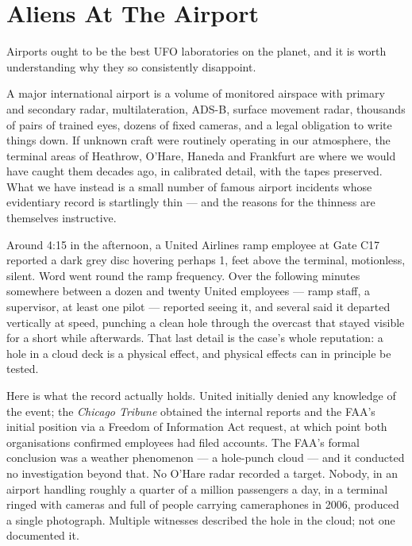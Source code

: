 \section{Aliens At The Airport}\label{sec:airport}

Airports ought to be the best UFO laboratories on the planet, and it is worth understanding why
they so consistently disappoint.

A major international airport is a volume of monitored airspace with primary and secondary radar,
multilateration, ADS-B, surface movement radar, thousands of pairs of trained eyes, dozens of
fixed cameras, and a legal obligation to write things down. If unknown craft were routinely
operating in our atmosphere, the terminal areas of Heathrow, O'Hare, Haneda and Frankfurt are
where we would have caught them decades ago, in calibrated detail, with the tapes preserved. What
we have instead is a small number of famous airport incidents whose evidentiary record is
startlingly thin --- and the reasons for the thinness are themselves instructive.

Around 4:15 in the afternoon, a United Airlines ramp employee at Gate C17 reported a dark grey
disc hovering perhaps 1, feet above the terminal, motionless, silent. Word went round the ramp
frequency. Over the following minutes somewhere between a dozen and twenty United employees ---
ramp staff, a supervisor, at least one pilot --- reported seeing it, and several said it departed
vertically at speed, punching a clean hole through the overcast that stayed visible for a short
while afterwards. That last detail is the case's whole reputation: a hole in a cloud deck is a
physical effect, and physical effects can in principle be tested.

Here is what the record actually holds. United initially denied any knowledge of the event; the
\emph{Chicago Tribune} obtained the internal reports and the FAA's initial position via a Freedom
of Information Act request, at which point both organisations confirmed employees had filed
accounts. The FAA's formal conclusion was a weather phenomenon --- a hole-punch cloud --- and it
conducted no investigation beyond that. No O'Hare radar recorded a target. Nobody, in an airport
handling roughly a quarter of a million passengers a day, in a terminal ringed with cameras and
full of people carrying cameraphones in 2006, produced a single photograph. Multiple witnesses
described the hole in the cloud; not one documented it.

